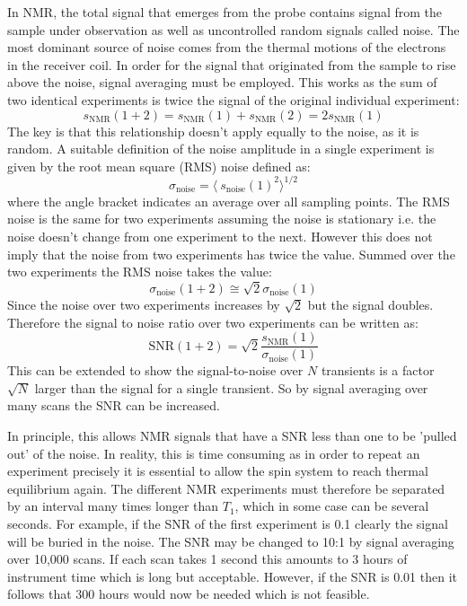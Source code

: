 In NMR, the total signal that emerges from the probe contains signal from the sample
under observation as well as uncontrolled random signals called noise. The most dominant source of noise comes from the thermal motions of the electrons
in the receiver coil. In order for the signal that originated from the sample to rise above the noise,
signal averaging must be employed. This works as the sum of two identical experiments is twice the signal
of the original individual experiment:
\begin{equation}
   s_\text{NMR}(1+2) = s_\text{NMR}(1) + s_\text{NMR}(2) = 2s_\text{NMR}(1)
\end{equation}
The key is that this relationship doesn't apply equally to the noise, as it is random. A suitable
definition of the noise amplitude in a single experiment is given by the root mean square (RMS) noise defined
 as:
 \begin{equation}
   \sigma_\text{noise} = \langle~s_{\text{noise}}(1)^2\rangle^{1/2}
 \end{equation}
 where the angle bracket indicates an average over all sampling points. The RMS noise is the same for two
 experiments assuming the noise is stationary i.e. the noise doesn't change from one experiment to the next.
 However this does not imply that the noise from two experiments has twice the value. Summed over the two experiments
 the RMS noise takes the value:
 \begin{equation}
   \sigma_\text{noise}(1+2) \cong \sqrt{2} \sigma_{\text{noise}}(1)
 \end{equation}
 Since the noise over two experiments increases by $\sqrt{2}$ but the signal doubles. Therefore the signal to noise
 ratio over two experiments can be written as:
 \begin{equation}
   \text{SNR}(1+2) = \sqrt{2}\frac{s_{\text{NMR}}(1)}{\sigma_{\text{noise}}(1)}
 \end{equation}
 This can be extended to show the signal-to-noise over $N$ transients is a factor $\sqrt{N}$ larger than the
 signal for a single transient. So by signal averaging over many scans the SNR can be increased.

In principle, this allows NMR signals that have a SNR less than one to be 'pulled out' of the noise. In reality, this is
time consuming as in order to repeat an experiment precisely it is essential to allow the spin system to
reach thermal equilibrium again. The different NMR experiments must therefore be separated by an interval
many times longer than $T_1$, which in some case can be several seconds. For example, if the SNR of the first
experiment is 0.1 clearly the signal will be buried in the noise. The SNR may be changed to 10:1 by signal averaging
over 10,000 scans. If each scan takes 1 second this amounts to 3 hours of instrument time which is long but
acceptable. However, if the SNR is 0.01 then it follows that 300 hours would now be needed which is not feasible.

